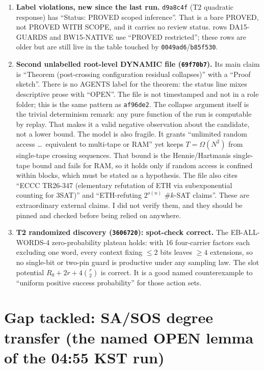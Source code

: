 \documentclass[11pt]{article}
\theoremstyle{definition}
\begin{document}
\begin{enumerate}
\item \textbf{Label violations, new since the last run.} \texttt{d9a8c4f} (T2 quadratic response) has ``Status: PROVED scoped inference''. That is a bare PROVED, not PROVED WITH SCOPE, and it carries no review status.  rows DA15-GUARDS and BW15-NATIVE use ``PROVED restricted''; these rows are older but are still live in the table touched by \texttt{0049ad6}/\texttt{b85f530}.
\item \textbf{Second unlabelled root-level DYNAMIC file (\texttt{69f70b7}).} Its main claim is ``Theorem (post-crossing configuration residual collapses)'' with a ``Proof sketch''. There is no AGENTS label for the theorem: the status line mixes descriptive prose with ``OPEN''. The file is not timestamped and not in a role folder; this is the same pattern as \texttt{af96de2}. The collapse argument itself is the trivial determinism remark: any pure function of the run is computable by replay. That makes it a valid negative observation about the candidate, not a lower bound. The model is also fragile. It grants ``unlimited random access \ldots\ equivalent to multi-tape or RAM'' yet keeps $T=\Omega(N^2)$ from single-tape crossing sequences. That bound is the Hennie/Hartmanis single-tape bound and fails for RAM, so it holds only if random access is confined within blocks, which must be stated as a hypothesis. The file also cites ``ECCC TR26-347 (elementary refutation of ETH via subexponential counting for 3SAT)'' and ``ETH-refuting $2^{o(n)}$ \#$k$-SAT claims''. These are extraordinary external claims. I did not verify them, and they should be pinned and checked before being relied on anywhere.
\item \textbf{T2 randomized discovery (\texttt{3606720}): spot-check correct.} The EB-ALL-WORDS-4 zero-probability plateau holds: with 16 four-carrier factors each excluding one word, every context fixing $\le2$ bits leaves $\ge4$ extensions, so no single-bit or two-pin guard is productive under any sampling law. The slot potential $R_0+2r+4\binom r2$ is correct. It is a good named counterexample to ``uniform positive success probability'' for those action sets.
\end{enumerate}

\section{Gap tackled: SA/SOS degree transfer (the named OPEN lemma of the 04:55 KST run)}
\end{document}
